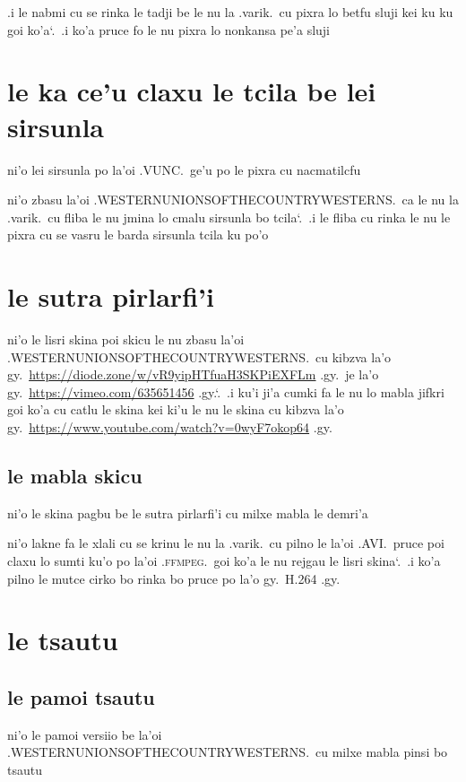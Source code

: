 \documentclass{report}
\newcommand\sds{\spacefactor\sfcode`.\ \space}
\begin{document}
.i le nabmi cu se rinka le tadji be le nu la .varik.\ cu pixra lo betfu sluji kei ku ku goi ko'a\sds  .i ko'a pruce fo le nu pixra lo nonkansa pe'a sluji

\section{le ka ce'u claxu le tcila be lei sirsunla}
ni'o lei sirsunla po la'oi .VUNC.\ ge'u po le pixra cu nacmatilcfu

ni'o zbasu la'oi .WESTERNUNIONSOFTHECOUNTRYWESTERNS.\ ca le nu la .varik.\ cu fliba le nu jmina lo cmalu sirsunla bo tcila\sds  .i le fliba cu rinka le nu le pixra cu se vasru le barda sirsunla tcila ku po'o

\section{le sutra pirlarfi'i}
ni'o le lisri skina poi skicu le nu zbasu la'oi .WESTERNUNIONSOFTHECOUNTRYWESTERNS.\ cu kibzva la'o gy.\ \url{https://diode.zone/w/vR9yipHTfuaH3SKPiEXFLm} .gy.\ je la'o gy.\ \url{https://vimeo.com/635651456} .gy.\sds  .i ku'i ji'a cumki fa le nu lo mabla jifkri goi ko'a cu catlu le skina kei ki'u le nu le skina cu kibzva la'o gy.\ \url{https://www.youtube.com/watch?v=0wyF7okop64} .gy.

\subsection{le mabla skicu}
ni'o le skina pagbu be le sutra pirlarfi'i cu milxe mabla le demri'a

ni'o lakne fa le xlali cu se krinu le nu la .varik.\ cu pilno le la'oi .AVI.\ pruce poi claxu lo sumti ku'o po la'oi .\textsc{ffmpeg}.\ goi ko'a le nu rejgau le lisri skina\sds  .i ko'a pilno le mutce cirko bo rinka bo pruce po la'o gy.\ H.264 .gy.

\section{le tsautu}
\subsection{le pamoi tsautu}
ni'o le pamoi versiio be la'oi .WESTERNUNIONSOFTHECOUNTRYWESTERNS.\ cu milxe mabla pinsi bo tsautu
\end{document}
